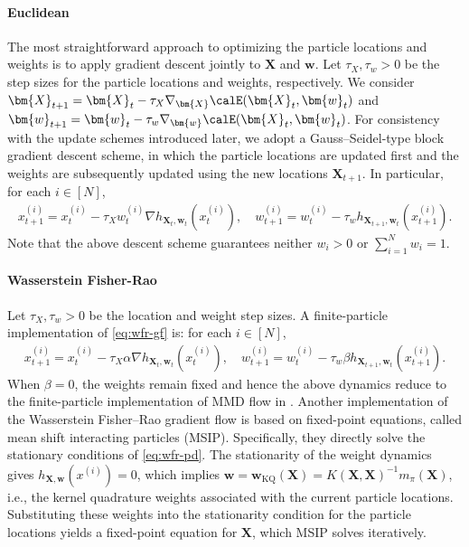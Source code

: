 \paragraph{Euclidean}
The most straightforward approach to optimizing the particle locations and weights is to apply gradient descent jointly to $\bm{X}$ and $\bm{w}$. 
Let $\tau_X,\tau_w>0$ be the step sizes for the particle locations and weights, respectively. We consider $\bm{X}_{t+1}=\bm{X}_t-\tau_X\nabla_{\bm{X}}\calE(\bm{X}_t,\bm{w}_t)$ and $\bm{w}_{t+1}=\bm{w}_t-\tau_w\nabla_{\bm{w}}\calE(\bm{X}_t,\bm{w}_t)$.
For consistency with the update schemes introduced later, we adopt a Gauss--Seidel-type block gradient descent scheme, in which the particle locations are updated first and the weights are subsequently updated using the new locations $\bm{X}_{t+1}$. 
In particular, for each $i\in[N]$, 
\begin{align}\label{eq:e-pd}
    x_{t+1}^{(i)}=x_t^{(i)}-\tau_X w_t^{(i)} \nabla h_{\bm{X}_t, \bm{w}_t}\left( x_t^{(i)} \right), \quad w_{t+1}^{(i)} =w_t^{(i)}-\tau_w h_{\bm{X}_{t+1},\bm{w}_t} \left(x_{t+1}^{(i)}\right) \tag{E-PD} .
\end{align}
Note that the above descent scheme guarantees neither $w_i>0$ or $\sum_{i=1}^N w_i =1$. 


\paragraph{Wasserstein Fisher-Rao}
Let $\tau_X,\tau_w>0$ be the location and weight step sizes.
A finite-particle implementation of \eqref{eq:wfr-gf} is: for each $i\in[N]$, 
\begin{align}\label{eq:wfr-pd}
x_{t+1}^{(i)}
= x_t^{(i)}-\tau_X\alpha \nabla h_{\bm{X}_t,\bm{w}_t} \left(x_t^{(i)} \right), \quad w_{t+1}^{(i)} = w_t^{(i)} - \tau_w\beta h_{\bm{X}_{t+1}, \bm{w}_t} \left(x_{t+1}^{(i)}\right) \tag{WFR-PD} .
\end{align}
When $\beta=0$, the weights remain fixed and hence the above dynamics reduce to the finite-particle implementation of MMD flow in \citet{arbel2019maximum}. 
Another implementation of the Wasserstein Fisher–Rao gradient flow is based on fixed-point equations, called mean shift interacting particles (MSIP). 
Specifically, they directly solve the stationary conditions of \eqref{eq:wfr-pd}. The stationarity of the weight dynamics gives $h_{\bm X,\bm w}(x^{(i)})=0$, which implies $\bm w=\bm w_{\mathrm{KQ}}(\bm X)=K(\bm X, \bm X)^{-1} m_\pi(\bm X)$, 
i.e., the kernel quadrature weights associated with the current particle locations. 
Substituting these weights into the stationarity condition for the particle locations yields a fixed-point equation for $\bm X$, which MSIP solves iteratively. 

